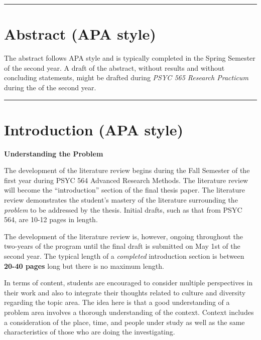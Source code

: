 \documentclass[
  openany]{book}
\begin{document}
\begin{center}\rule{0.5\linewidth}{0.5pt}\end{center}

\hypertarget{abstract-apa-style}{%
\section{Abstract (APA style)}\label{abstract-apa-style}}

The abstract follows APA style and is typically completed in the Spring Semester of the second year. A draft of the abstract, without results and without concluding statements, might be drafted during \emph{PSYC 565 Research Practicum} during the of the second year.

\begin{center}\rule{0.5\linewidth}{0.5pt}\end{center}

\hypertarget{introduction-apa-style}{%
\section{Introduction (APA style)}\label{introduction-apa-style}}

\textbf{Understanding the Problem}

The development of the literature review begins during the Fall Semester of the first year during PSYC 564 Advanced Research Methods. The literature review will become the ``introduction'' section of the final thesis paper. The literature review demonstrates the student's mastery of the literature surrounding the \emph{problem} to be addressed by the thesis. Initial drafts, such as that from PSYC 564, are 10-12 pages in length.

The development of the literature review is, however, ongoing throughout the two-years of the program until the final draft is submitted on May 1st of the second year. The typical length of a \emph{completed} introduction section is between \textbf{20-40 pages} long but there is no maximum length.

In terms of content, students are encouraged to consider multiple perspectives in their work and also to integrate their thoughts related to culture and diversity regarding the topic area. The idea here is that a good understanding of a problem area involves a thorough understanding of the context. Context includes a consideration of the place, time, and people under study as well as the same characteristics of those who are doing the investigating.
\end{document}
